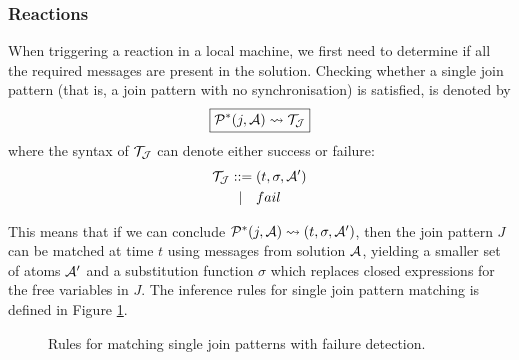 \newpage

\subsubsection{Reactions}

When triggering a reaction in a local machine, we first need to determine if
all the required messages are present in the solution. Checking whether a
single join pattern (that is, a join pattern with no synchronisation) is
satisfied, is denoted by
\begin{equation*}
 \boxed{\mathcal{P}^*(j,\mathcal{A}) \leadsto \mathcal{T}_{\mathcal{J}}}
\end{equation*}
where the syntax of $\mathcal{T}_{\mathcal{J}}$ can denote either success or failure:
\begin{align*}
 \mathcal{T}_{\mathcal{J}} ::= {}& (t, \sigma, \mathcal{A}') \\
       |\quad& fail
\end{align*}

This means that if we can conclude $\mathcal{P}^*(j, \mathcal{A}) \leadsto (t,\sigma,\mathcal{A}')$,
then the join pattern $J$ can be matched at time $t$ using messages from
solution $\mathcal{A}$, yielding a smaller set of atoms $\mathcal{A}'$ and a substitution
function $\sigma$ which replaces closed expressions for the free variables in
$J$. The inference rules for single join pattern matching is defined in Figure
\ref{fig:rule:join}.

\begin{figure}[!ht]
\caption{Rules for matching single join patterns with failure detection.\label{fig:rule:join}}
\end{figure}

